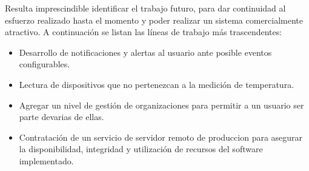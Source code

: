 Resulta imprescindible identificar el trabajo futuro, para dar continuidad al esfuerzo realizado hasta el momento y poder realizar un sistema comercialmente atractivo. A continuación se listan las líneas de trabajo más trascendentes:

\begin{itemize}
	\item Desarrollo de notificaciones y alertas al usuario ante posible eventos configurables.
	\item Lectura de dispositivos que no pertenezcan a la medición de temperatura.
	\item Agregar un nivel de gestión de organizaciones para permitir a un usuario ser parte devarias de ellas. 
	\item Contratación de un servicio de servidor remoto de produccion para asegurar la disponibilidad, integridad y utilización de recursos del software implementado.
\end{itemize}
